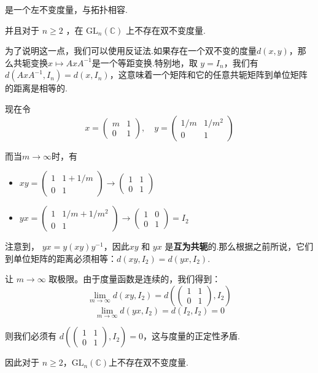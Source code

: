 \documentclass[lang=cn,a4paper,11pt,openany,scheme=chinese]{elegantbook}
\renewcommand{\geq}{\geqslant}
\begin{document}
\begin{instance}
是一个左不变度量，与拓扑相容.\par
并且对于 \(n \geq  2\) ，在 \({\mathrm{{GL}}}_{n}\left( \mathbb{C}\right)\) 上不存在双不变度量.\par
为了说明这一点，我们可以使用反证法.如果存在一个双不变的度量$d(x,y)$，那么共轭变换$x\mapsto AxA^{-1}$是一个等距变换.特别地，取 $y=I_n$，我们有 $d(AxA^{-1}, I_n) = d(x, I_n)$，这意味着一个矩阵和它的任意共轭矩阵到单位矩阵的距离是相等的.\par
现在令
$$x = \begin{pmatrix} m & 1 \\ 0 & 1 \end{pmatrix}, \quad y = \begin{pmatrix} 1/m & 1/m^2 \\ 0 & 1 \end{pmatrix}$$\par
而当$m\to\infty$时，有
\begin{itemize}
    \item $xy = \begin{pmatrix} 1 & 1 + 1/m \\ 0 & 1 \end{pmatrix} \to \begin{pmatrix} 1 & 1 \\ 0 & 1 \end{pmatrix}$
    \item $yx = \begin{pmatrix} 1 & 1/m + 1/m^2 \\ 0 & 1 \end{pmatrix} \to \begin{pmatrix} 1 & 0 \\ 0 & 1 \end{pmatrix} = I_2$
\end{itemize}\par
注意到， $yx=y(xy)y^{-1}$，因此$xy$ 和 $yx$ 是\textbf{互为共轭}的.那么根据之前所说，它们到单位矩阵的距离必须相等：$d(xy, I_2) = d(yx, I_2)$.\par
让 $m \to \infty$ 取极限。由于度量函数是连续的，我们得到：
    \[ \lim_{m\to\infty} d(xy, I_2) = d\left(\begin{pmatrix} 1 & 1 \\ 0 & 1 \end{pmatrix}, I_2\right) \]
    \[ \lim_{m\to\infty} d(yx, I_2) = d(I_2, I_2) = 0 \]\par
则我们必须有 $d\left(\begin{pmatrix} 1 & 1 \\ 0 & 1 \end{pmatrix}, I_2\right) = 0$，这与度量的正定性矛盾.\par
因此对于 $n \geq 2$，\({\mathrm{{GL}}}_{n}\left( \mathbb{C}\right)\)上不存在双不变度量.
\end{instance}
\end{document}

